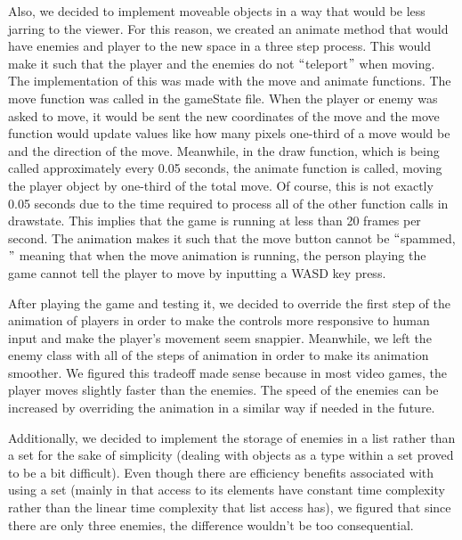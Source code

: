 \documentclass[12pt]{article}
\begin{document}
\vspace{\baselineskip}
Also, we decided to implement moveable objects in a way that would be less jarring to the viewer. For this reason, we created an animate method that would have enemies and player to the new space in a three step process. This would make it such that the player and the enemies do not $``$teleport$"$  when moving. The implementation of this was made with the move and animate functions. The move function was called in the gameState file. When the player or enemy was asked to move, it would be sent the new coordinates of the move and the move function would update values like how many pixels one-third of a move would be and the direction of the move. Meanwhile, in the draw function, which is being called approximately every 0.05 seconds, the animate function is called, moving the player object by one-third of the total move. Of course, this is not exactly 0.05 seconds due to the time required to process all of the other function calls in drawstate. This implies that the game is running at less than 20 frames per second. The animation makes it such that the move button cannot be $``$spammed,$"$  meaning that when the move animation is running, the person playing the game cannot tell the player to move by inputting a WASD key press.\par


\vspace{\baselineskip}
After playing the game and testing it, we decided to override the first step of the animation of players in order to make the controls more responsive to human input and make the player’s movement seem snappier. Meanwhile, we left the enemy class with all of the steps of animation in order to make its animation smoother. We figured this tradeoff made sense because in most video games, the player moves slightly faster than the enemies. The speed of the enemies can be increased by overriding the animation in a similar way if needed in the future.\par


\vspace{\baselineskip}
Additionally, we decided to implement the storage of enemies in a list rather than a set for the sake of simplicity (dealing with objects as a type within a set proved to be a bit difficult). Even though there are efficiency benefits associated with using a set (mainly in that access to its elements have constant time complexity rather than the linear time complexity that list access has), we figured that since there are only three enemies, the difference wouldn’t be too consequential.\par
\end{document}
